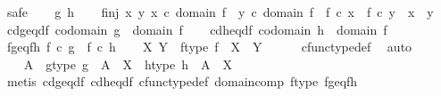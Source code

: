 \begin{isabellebody}
\ safe\isanewline
\ \ \isamarkupfalse%
\ g\ h\isanewline
\ \ \isamarkupfalse%
\ f{\isacharunderscore}{\kern0pt}inj{\isacharcolon}{\kern0pt}\ {\isachardoublequoteopen}{\isasymforall}x\ y{\isachardot}{\kern0pt}\ x\ {\isasymin}\isactrlsub c\ domain\ f\ {\isasymand}\ y\ {\isasymin}\isactrlsub c\ domain\ f\ {\isasymand}\ f\ {\isasymcirc}\isactrlsub c\ x\ {\isacharequal}{\kern0pt}\ f\ {\isasymcirc}\isactrlsub c\ y\ {\isasymlongrightarrow}\ x\ {\isacharequal}{\kern0pt}\ y{\isachardoublequoteclose}\isanewline
\ \ \isamarkupfalse%
\ cd{\isacharunderscore}{\kern0pt}g{\isacharunderscore}{\kern0pt}eq{\isacharunderscore}{\kern0pt}d{\isacharunderscore}{\kern0pt}f{\isacharcolon}{\kern0pt}\ {\isachardoublequoteopen}codomain\ g\ {\isacharequal}{\kern0pt}\ domain\ f{\isachardoublequoteclose}\isanewline
\ \ \isamarkupfalse%
\ cd{\isacharunderscore}{\kern0pt}h{\isacharunderscore}{\kern0pt}eq{\isacharunderscore}{\kern0pt}d{\isacharunderscore}{\kern0pt}f{\isacharcolon}{\kern0pt}\ {\isachardoublequoteopen}codomain\ h\ {\isacharequal}{\kern0pt}\ domain\ f{\isachardoublequoteclose}\isanewline
\ \ \isamarkupfalse%
\ fg{\isacharunderscore}{\kern0pt}eq{\isacharunderscore}{\kern0pt}fh{\isacharcolon}{\kern0pt}\ {\isachardoublequoteopen}f\ {\isasymcirc}\isactrlsub c\ g\ {\isacharequal}{\kern0pt}\ f\ {\isasymcirc}\isactrlsub c\ h{\isachardoublequoteclose}\isanewline
\isanewline
\ \ \isamarkupfalse%
\ X\ Y\ \ f{\isacharunderscore}{\kern0pt}type{\isacharcolon}{\kern0pt}\ {\isachardoublequoteopen}f\ {\isacharcolon}{\kern0pt}\ X\ {\isasymrightarrow}\ Y{\isachardoublequoteclose}\isanewline
\ \ \ \ \isamarkupfalse%
\ cfunc{\isacharunderscore}{\kern0pt}type{\isacharunderscore}{\kern0pt}def\ \isamarkupfalse%
\ auto\ \ \ \ \isanewline
\ \ \isamarkupfalse%
\ A\ \ g{\isacharunderscore}{\kern0pt}type{\isacharcolon}{\kern0pt}\ {\isachardoublequoteopen}g\ {\isacharcolon}{\kern0pt}\ A\ {\isasymrightarrow}\ X{\isachardoublequoteclose}\ \ h{\isacharunderscore}{\kern0pt}type{\isacharcolon}{\kern0pt}\ {\isachardoublequoteopen}h\ {\isacharcolon}{\kern0pt}\ A\ {\isasymrightarrow}\ X{\isachardoublequoteclose}\isanewline
\ \ \ \ \isamarkupfalse%
\ {\isacharparenleft}{\kern0pt}metis\ cd{\isacharunderscore}{\kern0pt}g{\isacharunderscore}{\kern0pt}eq{\isacharunderscore}{\kern0pt}d{\isacharunderscore}{\kern0pt}f\ cd{\isacharunderscore}{\kern0pt}h{\isacharunderscore}{\kern0pt}eq{\isacharunderscore}{\kern0pt}d{\isacharunderscore}{\kern0pt}f\ cfunc{\isacharunderscore}{\kern0pt}type{\isacharunderscore}{\kern0pt}def\ domain{\isacharunderscore}{\kern0pt}comp\ f{\isacharunderscore}{\kern0pt}type\ fg{\isacharunderscore}{\kern0pt}eq{\isacharunderscore}{\kern0pt}fh{\isacharparenright}{\kern0pt}\isanewline

\end{isabellebody}
